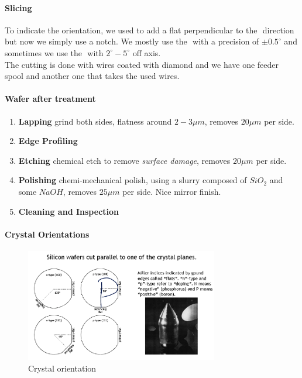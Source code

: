\documentclass[
]{article}
\begin{document}
\hypertarget{slicing}{%
\paragraph{Slicing}\label{slicing}}

To indicate the orientation, we used to add a flat perpendicular to the
\(<110>\) direction but now we simply use a notch. We mostly use the
\(<100>\) with a precision of \(\pm 0.5^\circ\) and sometimes we use the
\(<111>\) with \(2^\circ-5^\circ\) off axis.\\
The cutting is done with wires coated with diamond and we have one
feeder spool and another one that takes the used wires.

\hypertarget{wafer-after-treatment}{%
\paragraph{Wafer after treatment}\label{wafer-after-treatment}}

\begin{enumerate}
\def\labelenumi{\arabic{enumi}.}
\item
  \textbf{Lapping} grind both sides, flatness around \(2-3 \mu m\),
  removes \(20\mu m\) per side.
\item
  \textbf{Edge Profiling}
\item
  \textbf{Etching} chemical etch to remove \emph{surface damage},
  removes \(20\mu m\) per side.
\item
  \textbf{Polishing} chemi-mechanical polish, using a slurry composed of
  \(Si O_2\) and some \(NaOH\), removes \(25\mu m\) per side. Nice
  mirror finish.
\item
  \textbf{Cleaning and Inspection}
\end{enumerate}

\hypertarget{crystal-orientations}{%
\paragraph{Crystal Orientations}\label{crystal-orientations}}

\begin{figure}
\hypertarget{fig:crystal-orientation-label}{%
\centering
\includegraphics[width=0.75\textwidth,height=\textheight]{crystal_orientation.png}
\caption{Crystal orientation}\label{fig:crystal-orientation-label}
}
\end{figure}
\end{document}

